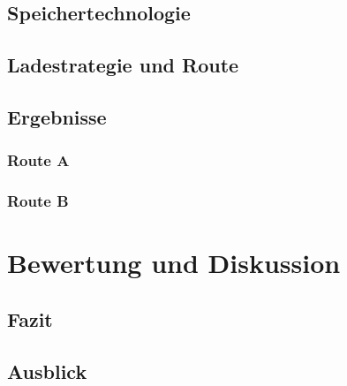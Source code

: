 \documentclass[twoside]{scrreprt}
\begin{document}
\section{Speichertechnologie}
\section{Ladestrategie und Route}
\section{Ergebnisse}
\subsection{Route A}
\subsection{Route B}

\chapter{Bewertung und Diskussion} %
\section{Fazit}
\section{Ausblick}




 
\end{document}
